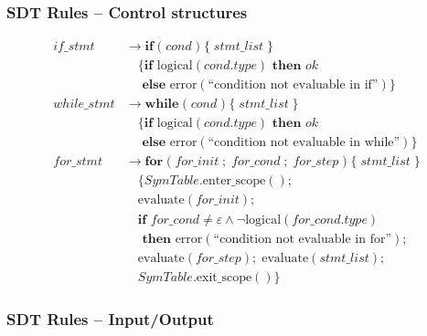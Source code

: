 \documentclass[letterpaper,12pt,oneside]{article}
\begin{document}
\subsubsection{SDT Rules -- Control structures}

\begin{align*}
if\_stmt &\rightarrow \mathbf{if} \; \mathbf{(} \; cond \; \mathbf{)} \; \mathbf{\{} \; stmt\_list \; \mathbf{\}} \\
        &\quad \{\textbf{if } \text{logical}(cond.type) \textbf{ then } ok \\
        &\quad \textbf{ else } \text{error}(\text{``condition not evaluable in if''})\} \\[10pt]
while\_stmt &\rightarrow \mathbf{while} \; \mathbf{(} \; cond \; \mathbf{)} \; \mathbf{\{} \; stmt\_list \; \mathbf{\}} \\
           &\quad \{\textbf{if } \text{logical}(cond.type) \textbf{ then } ok \\
           &\quad \textbf{ else } \text{error}(\text{``condition not evaluable in while''})\} \\[10pt]
for\_stmt &\rightarrow \mathbf{for} \; \mathbf{(} \; for\_init \; \mathbf{;} \; for\_cond \; \mathbf{;} \; for\_step \; \mathbf{)} \; \mathbf{\{} \; stmt\_list \; \mathbf{\}} \\
         &\quad \{SymTable.\text{enter\_scope}(); \\
         &\quad \text{evaluate}(for\_init); \\
         &\quad \textbf{if } for\_cond \neq \varepsilon \land \neg\text{logical}(for\_cond.type) \\
         &\quad \textbf{ then } \text{error}(\text{``condition not evaluable in for''}); \\
         &\quad \text{evaluate}(for\_step); \; \text{evaluate}(stmt\_list); \\
         &\quad SymTable.\text{exit\_scope}()\}
\end{align*}

\subsubsection{SDT Rules -- Input/Output}
\end{document}
